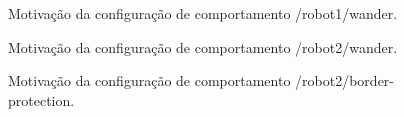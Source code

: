 \datatable
\begin{figure}[htb]
    \centering
    
    \caption{Motivação da configuração de comportamento /robot1/wander.} \label{fig:motivacao1}
\end{figure}

\datatable
\begin{figure}[htb]
    \centering
    
    \caption{Motivação da configuração de comportamento /robot2/wander.} \label{fig:motivacao2}
\end{figure}

\datatable
\begin{figure}[htb]
    \centering
    
    \caption{Motivação da configuração de comportamento /robot2/border-protection.} \label{fig:motivacao3}
\end{figure}